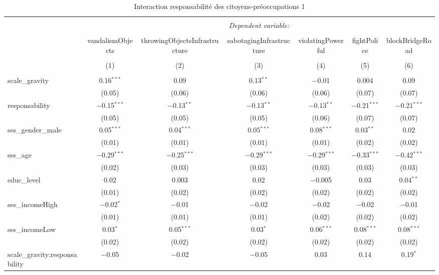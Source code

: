 \documentclass[
]{article}
\begin{document}
\begin{sidewaystable}[!htbp] \centering 
  \caption{Interaction responsabilité des citoyens-préoccupations 1} 
  \label{} 
\begin{tabular}{@{\extracolsep{1pt}}lcccccc} 
\\[-1.8ex]\hline 
\hline \\[-1.8ex] 
 & \multicolumn{6}{c}{\textit{Dependent variable:}} \\ 
\cline{2-7} 
\\[-1.8ex] & vandalismObjects & throwingObjectsInfrastructure & sabotagingInfrastructure & violatingPowerful & fightPolice & blockBridgeRoad \\ 
\\[-1.8ex] & (1) & (2) & (3) & (4) & (5) & (6)\\ 
\hline \\[-1.8ex] 
 scale\_gravity & 0.16$^{***}$ & 0.09 & 0.13$^{**}$ & $-$0.01 & 0.004 & 0.09 \\ 
  & (0.05) & (0.06) & (0.06) & (0.06) & (0.07) & (0.07) \\ 
  responsability & $-$0.15$^{***}$ & $-$0.13$^{**}$ & $-$0.13$^{**}$ & $-$0.13$^{**}$ & $-$0.21$^{***}$ & $-$0.21$^{***}$ \\ 
  & (0.05) & (0.05) & (0.05) & (0.06) & (0.07) & (0.07) \\ 
  ses\_gender\_male & 0.05$^{***}$ & 0.04$^{***}$ & 0.05$^{***}$ & 0.08$^{***}$ & 0.03$^{**}$ & 0.02 \\ 
  & (0.01) & (0.01) & (0.01) & (0.01) & (0.02) & (0.02) \\ 
  ses\_age & $-$0.29$^{***}$ & $-$0.25$^{***}$ & $-$0.29$^{***}$ & $-$0.29$^{***}$ & $-$0.33$^{***}$ & $-$0.42$^{***}$ \\ 
  & (0.02) & (0.03) & (0.03) & (0.03) & (0.03) & (0.03) \\ 
  educ\_level & 0.02 & 0.003 & 0.02 & $-$0.005 & 0.03 & 0.04$^{**}$ \\ 
  & (0.01) & (0.02) & (0.02) & (0.02) & (0.02) & (0.02) \\ 
  ses\_incomeHigh & $-$0.02$^{*}$ & $-$0.01 & $-$0.02 & $-$0.02 & $-$0.02 & $-$0.01 \\ 
  & (0.01) & (0.01) & (0.01) & (0.02) & (0.02) & (0.02) \\ 
  ses\_incomeLow & 0.03$^{*}$ & 0.05$^{***}$ & 0.03$^{*}$ & 0.06$^{***}$ & 0.08$^{***}$ & 0.08$^{***}$ \\ 
  & (0.02) & (0.02) & (0.02) & (0.02) & (0.02) & (0.02) \\ 
  scale\_gravity:responsability & $-$0.05 & $-$0.02 & $-$0.05 & 0.03 & 0.14 & 0.19$^{*}$ \\ 

\end{tabular}
\end{sidewaystable}
\end{document}
